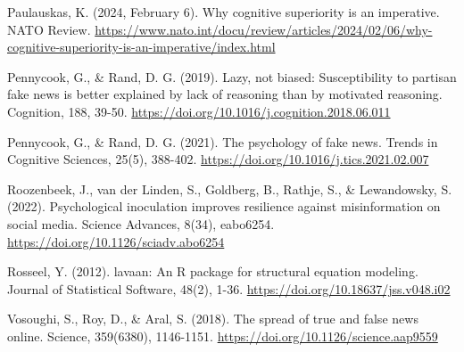 \documentclass[11pt]{article}
\begin{document}
\noindent Paulauskas, K. (2024, February 6). Why cognitive superiority is an imperative. NATO Review. \url{https://www.nato.int/docu/review/articles/2024/02/06/why-cognitive-superiority-is-an-imperative/index.html}\par

\noindent Pennycook, G., \& Rand, D. G. (2019). Lazy, not biased: Susceptibility to partisan fake news is better explained by lack of reasoning than by motivated reasoning. Cognition, 188, 39-50. \url{https://doi.org/10.1016/j.cognition.2018.06.011}\par

\noindent Pennycook, G., \& Rand, D. G. (2021). The psychology of fake news. Trends in Cognitive Sciences, 25(5), 388-402. \url{https://doi.org/10.1016/j.tics.2021.02.007}\par

\noindent Roozenbeek, J., van der Linden, S., Goldberg, B., Rathje, S., \& Lewandowsky, S. (2022). Psychological inoculation improves resilience against misinformation on social media. Science Advances, 8(34), eabo6254. \url{https://doi.org/10.1126/sciadv.abo6254}\par

\noindent Rosseel, Y. (2012). lavaan: An R package for structural equation modeling. Journal of Statistical Software, 48(2), 1-36. \url{https://doi.org/10.18637/jss.v048.i02}\par

\noindent Vosoughi, S., Roy, D., \& Aral, S. (2018). The spread of true and false news online. Science, 359(6380), 1146-1151. \url{https://doi.org/10.1126/science.aap9559}\par
\endgroup
\end{document}
